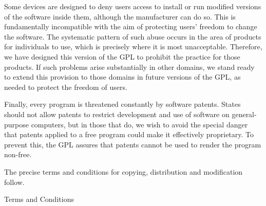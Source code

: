 Some devices are designed to deny users access to install or run
modified versions of the software inside them, although the manufacturer
can do so.  This is fundamentally incompatible with the aim of
protecting users' freedom to change the software.  The systematic
pattern of such abuse occurs in the area of products for individuals to
use, which is precisely where it is most unacceptable.  Therefore, we
have designed this version of the GPL to prohibit the practice for those
products.  If such problems arise substantially in other domains, we
stand ready to extend this provision to those domains in future versions
of the GPL, as needed to protect the freedom of users.

Finally, every program is threatened constantly by software patents.
States should not allow patents to restrict development and use of
software on general-purpose computers, but in those that do, we wish to
avoid the special danger that patents applied to a free program could
make it effectively proprietary.  To prevent this, the GPL assures that
patents cannot be used to render the program non-free.

The precise terms and conditions for copying, distribution and
modification follow.

\clearpage  %

\begin{center}
  \Large \sc Terms and Conditions
\end{center}

